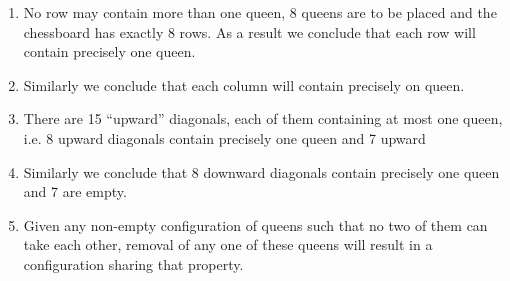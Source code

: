 \begin{enumerate}[wide, nosep, label=(\alph*)]
	\item \label{en:property-a}
	No row may contain more than one queen, 8 queens are to be placed and the chessboard has exactly 8 rows. As a result we conclude that each row will contain precisely one queen.
	\item Similarly we conclude that each column will contain precisely on queen.
	\item There are 15 ``upward'' diagonals, each of them containing at most one queen, i.e. 8 upward diagonals contain precisely one queen and 7 upward
	\item Similarly we conclude that 8 downward diagonals contain precisely one queen and 7 are empty.
	\item Given any non-empty configuration of queens such that no two of them can take each other, removal of any one of these queens will result in a configuration sharing that property.
\end{enumerate}

